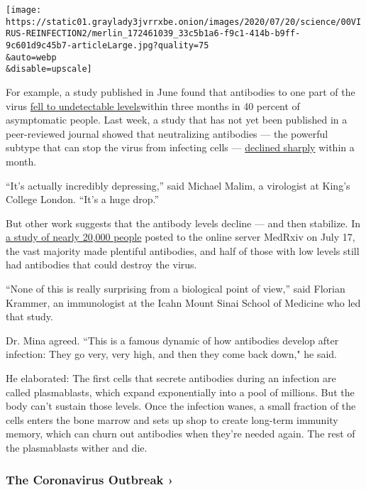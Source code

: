 \texttt{[image: https://static01.graylady3jvrrxbe.onion/images/2020/07/20/science/00VIRUS-REINFECTION2/merlin\_172461039\_33c5b1a6-f9c1-414b-b9ff-9c601d9c45b7-articleLarge.jpg?quality=75\\\&auto=webp\\\&disable=upscale]}

For example, a study published in June found that antibodies to one part
of the virus
\href{https://www.nytimes3xbfgragh.onion/2020/06/18/health/coronavirus-antibodies.html}{fell
to undetectable levels}within three months in 40 percent of asymptomatic
people. Last week, a study that has not yet been published in a
peer-reviewed journal showed that neutralizing antibodies --- the
powerful subtype that can stop the virus from infecting cells ---
\href{https://www.medrxiv.org/content/10.1101/2020.07.09.20148429v1}{declined
sharply} within a month.

``It's actually incredibly depressing,'' said Michael Malim, a
virologist at King's College London. ``It's a huge drop.''

But other work suggests that the antibody levels decline --- and then
stabilize. In
\href{https://www.medrxiv.org/content/10.1101/2020.07.14.20151126v1}{a
study of nearly 20,000 people} posted to the online server MedRxiv on
July 17, the vast majority made plentiful antibodies, and half of those
with low levels still had antibodies that could destroy the virus.

``None of this is really surprising from a biological point of view,''
said Florian Krammer, an immunologist at the Icahn Mount Sinai School of
Medicine who led that study.

Dr. Mina agreed. ``This is a famous dynamic of how antibodies develop
after infection: They go very, very high, and then they come back down,"
he said.

He elaborated: The first cells that secrete antibodies during an
infection are called plasmablasts, which expand exponentially into a
pool of millions. But the body can't sustain those levels. Once the
infection wanes, a small fraction of the cells enters the bone marrow
and sets up shop to create long-term immunity memory, which can churn
out antibodies when they're needed again. The rest of the plasmablasts
wither and die.

\href{https://www.nytimes3xbfgragh.onion/news-event/coronavirus?action=click\&pgtype=Article\&state=default\&region=MAIN_CONTENT_3\&context=storylines_faq}{}

\hypertarget{the-coronavirus-outbreak-}{%
\subsubsection{The Coronavirus Outbreak
›}\label{the-coronavirus-outbreak-}}

